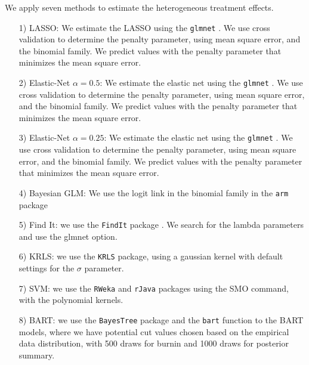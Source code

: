 \documentclass[12pt,letterpaper]{article}
\numberwithin{equation}{section}
\numberwithin{equation}{section}
\begin{document}
We apply seven methods to estimate the heterogeneous treatment effects. 
\begin{itemize}
\item[1)] LASSO:  We estimate the LASSO using the {\tt glmnet} \citep{FriHasTib10}.  We use cross validation to determine the penalty parameter, using mean square error, and the binomial family.  We predict values with the penalty parameter that minimizes the mean square error.  
\item[2)] Elastic-Net $\alpha = 0.5$: We estimate the elastic net using the {\tt glmnet} \citep{FriHasTib10}.  We use cross validation to determine the penalty parameter, using mean square error, and the binomial family.  We predict values with the penalty parameter that minimizes the mean square error. 
\item[3)] Elastic-Net $\alpha = 0.25$: We estimate the elastic net using the {\tt glmnet} \citep{FriHasTib10}.  We use cross validation to determine the penalty parameter, using mean square error, and the binomial family.  We predict values with the penalty parameter that minimizes the mean square error. 
\item[4)] Bayesian GLM: We use the logit link in the binomial family in the {\tt arm} package \citep{Gelman07}
\item[5)] Find It: we use the {\tt FindIt} package \citep{ImaRat12}.  We search for the lambda parameters and use the glmnet option.  
\item[6)] KRLS: we use the {\tt KRLS} package, using a gaussian kernel with default settings for the $\sigma$ parameter.  
\item[7)] SVM: we use the {\tt RWeka} and {\tt rJava} packages using the SMO command, with the polynomial kernels.  
\item[8)] BART: we use the {\tt BayesTree} package and the {\tt bart} function to the BART models, where we have potential cut values chosen based on the empirical data distribution, with 500 draws for burnin and 1000 draws for posterior summary.  
\end{itemize}


\end{document}
